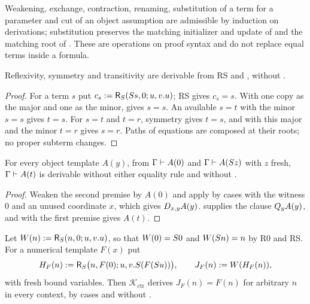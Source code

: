 Weakening, exchange, contraction, renaming, substitution of a term for a
parameter and cut of an object assumption are admissible by induction on
derivations; substitution preserves the matching initializer and update of
 and the matching root of . These are operations on
proof syntax and do not replace equal terms inside a formula.

\begin{lemma}
\label{obs:lem:cc-eq}
Reflexivity, symmetry and transitivity are derivable from RS and
, without .
\end{lemma}

\begin{proof}
For a term $s$ put $c_s\mathrel{:=}\mathsf{R}_{S}(S s,0;u,v.u)$; RS gives
$c_s=s$. With one copy as the major and one as the minor,  gives
$s=s$. An available $s=t$ with the minor $s=s$ gives $t=s$. For $s=t$ and
$t=r$, symmetry gives $t=s$, and  with this major and the minor
$t=r$ gives $s=r$. Paths of equations are composed at their roots; no proper
subterm changes.
\end{proof}

\begin{lemma}
\label{obs:lem:cc-cases}
For every object template $A(y)$, from $\Gamma\vdash A(0)$ and
$\Gamma\vdash A(S z)$ with $z$ fresh, $\Gamma\vdash A(t)$ is derivable
without either equality rule and without .
\end{lemma}

\begin{proof}
Weaken the second premise by $A(0)$ and apply  by cases with the
witness $0$ and an unused coordinate $x$, which gives $D_{x,y}A(y)$.
 supplies the clause $Q_{y}A(y)$, and  with the first
premise gives $A(t)$.
\end{proof}

\begin{lemma}
\label{obs:lem:cc-rep}
Let $W(n)\mathrel{:=}\mathsf{R}_{S}(n,0;u,v.u)$, so that $W(0)=S 0$ and
$W(S n)=n$ by R0 and RS. For a numerical template $F(x)$ put
\[
H_F(n)\mathrel{:=}\mathsf{R}_{S}\bigl(n,F(0);u,v.S(F(S u))\bigr),\qquad
J_F(n)\mathrel{:=} W(H_F(n)),
\]
with fresh bound variables. Then $\mathcal{K}_{\mathrm{ctr}}$ derives
$J_F(n)=F(n)$ for arbitrary $n$ in every context, by cases and without
.
\end{lemma}

